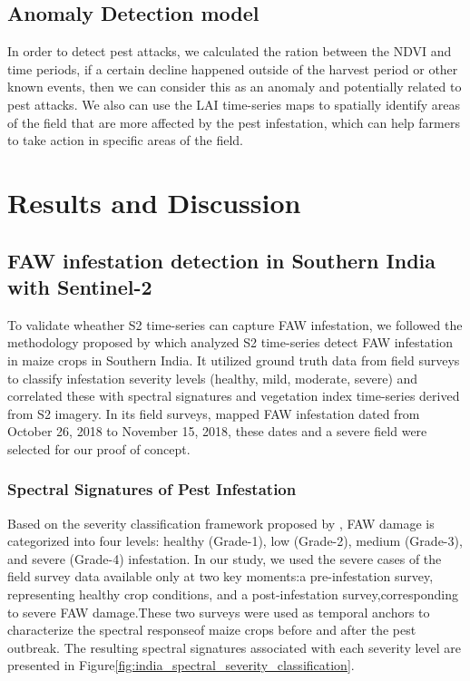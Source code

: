 \documentclass{article} %
\begin{document}
    \subsection{Anomaly Detection model}

        In order to detect pest attacks, we calculated the ration between the NDVI and time periods, if a certain decline happened outside of the harvest period or other known events, then we can consider this as an anomaly and potentially related to pest attacks. We also can use the LAI time-series maps to spatially identify areas of the field that are more affected by the pest infestation, which can help farmers to take action in specific areas of the field.

    \section{Results and Discussion}
            
        \subsection{FAW infestation detection in Southern India with Sentinel-2}
            To validate wheather S2 time-series can capture FAW infestation, we followed the methodology proposed by \cite{prabhakar2022detecting} which analyzed S2 time-series detect FAW infestation in maize crops in Southern India. It utilized ground truth data from field surveys to classify infestation severity levels (healthy, mild, moderate, severe) and correlated these with spectral signatures and vegetation index time-series derived from S2 imagery. In its field surveys, \cite{prabhakar2022detecting} mapped FAW infestation dated from October 26, 2018 to November 15, 2018, these dates and a severe field were selected for our proof of concept.

            \subsubsection{Spectral Signatures of Pest Infestation}
                Based on the severity classification framework proposed by \cite{prabhakar2022detecting}, FAW damage is categorized into four levels: healthy (Grade-1), low (Grade-2), medium (Grade-3), and severe (Grade-4) infestation. In our study, we used the severe cases of the \cite{prabhakar2022detecting} field survey data available only at two key moments:a pre-infestation survey, representing healthy crop conditions, and a post-infestation survey,corresponding to severe FAW damage.These two surveys were used as temporal anchors to characterize the spectral responseof maize crops before and after the pest outbreak. The resulting spectral signatures associated with each severity level are presented in Figure\ref{fig:india_spectral_severity_classification}.
                
\end{document}
